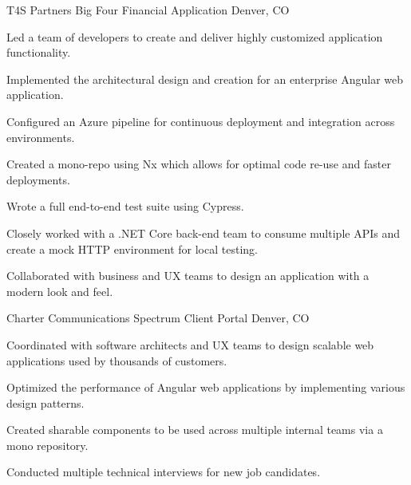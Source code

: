 \begin{cventries}
    \cventry
    {T4S Partners} %
    {Big Four Financial Application} %
    {Denver, CO} %
    {} %
    {
    \begin{cvitems} %
        \item {Led a team of developers to create and deliver highly customized application functionality.}
        \item {Implemented the architectural design and creation for an enterprise Angular web application.}
        \item {Configured an Azure pipeline for continuous deployment and integration across environments.}
        \item {Created a mono-repo using Nx which allows for optimal code re-use and faster deployments.}
        \item {Wrote a full end-to-end test suite using Cypress.}
        \item {Closely worked with a .NET Core back-end team to consume multiple APIs and create a mock HTTP environment for local testing.}
        \item {Collaborated with business and UX teams to design an application with a modern look and feel.}
    \end{cvitems}
    }

    \cventry
    {Charter Communications} %
    {Spectrum Client Portal} %
    {Denver, CO} %
    {} %
    {
    \begin{cvitems} %
        \item {Coordinated with software architects and UX teams to design scalable web applications used by thousands of customers.}
        \item {Optimized the performance of Angular web applications by implementing various design patterns.}
        \item {Created sharable components to be used across multiple internal teams via a mono repository.}
        \item {Conducted multiple technical interviews for new job candidates.}
    \end{cvitems}
    }


\end{cventries}
